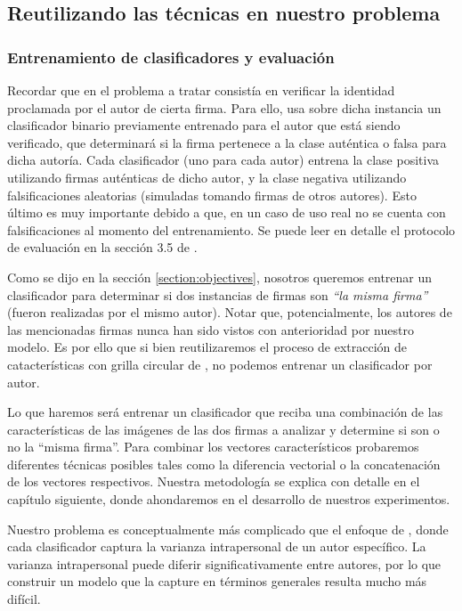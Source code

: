 \subsection{Reutilizando las técnicas en nuestro problema}

\subsubsection{Entrenamiento de clasificadores y evaluación}

Recordar que en \cite{tesis-parodi} el problema a tratar consistía en verificar la identidad proclamada por el autor de cierta firma. Para ello, usa sobre dicha instancia un clasificador binario previamente entrenado para el autor que está siendo verificado, que determinará si la firma pertenece a la clase auténtica o falsa para dicha autoría. Cada clasificador (uno para cada autor) entrena la clase positiva utilizando firmas auténticas de dicho autor, y la clase negativa utilizando falsificaciones aleatorias (simuladas tomando firmas de otros autores). Esto último es muy importante debido a que, en un caso de uso real no se cuenta con falsificaciones al momento del entrenamiento. Se puede leer en detalle el protocolo de evaluación en la sección 3.5 de \cite{tesis-parodi}.

Como se dijo en la sección \ref{section:objectives}, nosotros queremos entrenar un clasificador para determinar si dos instancias de firmas son \textit{``la misma firma''} (fueron realizadas por el mismo autor). Notar que, potencialmente, los autores de las mencionadas firmas nunca han sido vistos con anterioridad por nuestro modelo. Es por ello que si bien reutilizaremos el proceso de extracción de catacterísticas con grilla circular de \cite{tesis-parodi}, no podemos entrenar un clasificador por autor.

Lo que haremos será entrenar un clasificador que reciba una combinación de las características de las imágenes de las dos firmas a analizar y determine si son o no la ``misma firma''. Para combinar los vectores característicos probaremos diferentes técnicas posibles tales como la diferencia vectorial o la concatenación de los vectores respectivos.  Nuestra metodología se explica con detalle en el capítulo siguiente, donde ahondaremos en el desarrollo de nuestros experimentos.

Nuestro problema es conceptualmente más complicado que el enfoque de \cite{tesis-parodi}, donde cada clasificador captura la varianza intrapersonal de un autor específico. La varianza intrapersonal puede diferir significativamente entre autores, por lo que construir un modelo que la capture en términos generales resulta mucho más difícil.

